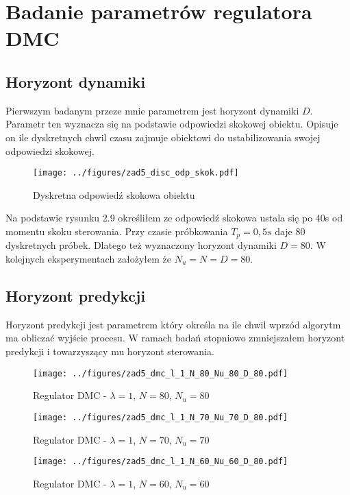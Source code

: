 \documentclass[a4paper,titlepage,11pt,floatssmall]{mwrep}
\begin{document}
\section{Badanie parametrów regulatora DMC}
\subsection{Horyzont dynamiki}
Pierwszym badanym przeze mnie parametrem jest horyzont dynamiki $D$. Parametr ten wyznacza się na podstawie odpowiedzi skokowej obiektu. Opisuje on ile dyskretnych chwil czasu zajmuje obiektowi do ustabilizowania swojej odpowiedzi skokowej.


\begin{figure}[H]
\centering
\texttt{[image: ../figures/zad5\_disc\_odp\_skok.pdf]}
\caption{Dyskretna odpowiedź skokowa obiektu}
\end{figure}

Na podstawie rysunku 2.9 określiłem ze odpowiedź skokowa ustala się po 40s od momentu skoku sterowania. Przy czasie próbkowania $T_p = 0,5s$ daje 80 dyskretnych próbek. Dlatego też wyznaczony horyzont dynamiki $D = 80$. W kolejnych eksperymentach założyłem że $N_u = N = D = 80$.
\newpage
\subsection{Horyzont predykcji}
Horyzont predykcji jest parametrem który określa na ile chwil wprzód algorytm ma obliczać wyjście procesu. W ramach badań stopniowo zmniejszałem horyzont predykcji i towarzyszący mu horyzont sterowania.

\begin{figure}[H]
\centering
\texttt{[image: ../figures/zad5\_dmc\_l\_1\_N\_80\_Nu\_80\_D\_80.pdf]}
\caption{Regulator DMC - $\lambda = 1$, $N = 80$, $N_{u} = 80$}
\end{figure}

\begin{figure}[H]
\centering
\texttt{[image: ../figures/zad5\_dmc\_l\_1\_N\_70\_Nu\_70\_D\_80.pdf]}
\caption{Regulator DMC - $\lambda = 1$, $N = 70$, $N_{u} = 70$}
\end{figure}

\begin{figure}[H]
\centering
\texttt{[image: ../figures/zad5\_dmc\_l\_1\_N\_60\_Nu\_60\_D\_80.pdf]}
\caption{Regulator DMC - $\lambda = 1$, $N = 60$, $N_{u} = 60$}
\end{figure}
\end{document}
